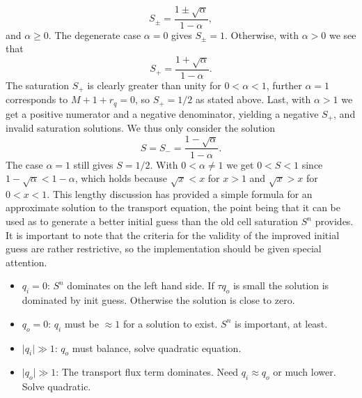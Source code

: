 \begin{equation*}
S_{\pm} = \frac{1 \pm \sqrt{\alpha}}{1 - \alpha},
\end{equation*}
and $\alpha \geq 0$. The degenerate case $\alpha = 0$ gives $S_{\pm} = 1$. Otherwise, with $\alpha > 0$ we see that
\begin{equation*}
S_{+} = \frac{1 + \sqrt{\alpha}}{1 - \alpha}.
\end{equation*}
The saturation $S_+$ is clearly greater than unity for $0  < \alpha < 1$, further $\alpha = 1$ corresponds to $M + 1 + r_q = 0$, so $S_+ = 1/2$ as stated above. Last, with $\alpha > 1$ we get a positive numerator and a negative denominator, yielding a negative $S_+$, and invalid saturation solutions. We thus only consider the solution
\begin{equation*}
S = S_{-} = \frac{1 - \sqrt{\alpha}}{1 - \alpha}.
\end{equation*}
The case $\alpha = 1$ still gives $S = 1/2$. With $0 < \alpha \neq 1$ we get $0 < S < 1$ since $1 - \sqrt{\alpha} < 1 - \alpha$, which holds because $\sqrt{x} < x$ for $x > 1$ and $\sqrt{x} > x$ for $0 < x < 1$. This lengthy discussion has provided a simple formula for an approximate solution to the transport equation, the point being that it can be used as to generate a better initial guess than the old cell saturation $S^n$ provides. It is important to note that the criteria for the validity of the improved initial guess are rather restrictive, so the implementation should be given special attention.

\noindent\makebox[\linewidth]{\rule{\textwidth}{0.4pt}}

\begin{itemize}
\item $q_i = 0$: $S^n$ dominates on the left hand side. If $\tau q_o$ is small the solution is dominated by init guess. Otherwise the solution is close to zero.
\item $q_o = 0$: $q_i$ must be $\approx 1$ for a solution to exist. $S^n$ is important, at least.
\item $\vert q_i \vert \gg 1$: $q_o$ must balance, solve quadratic equation.
\item $\vert q_o \vert \gg 1$: The transport flux term dominates. Need $q_i \approx q_o$ or much lower. Solve quadratic.
\end{itemize}

